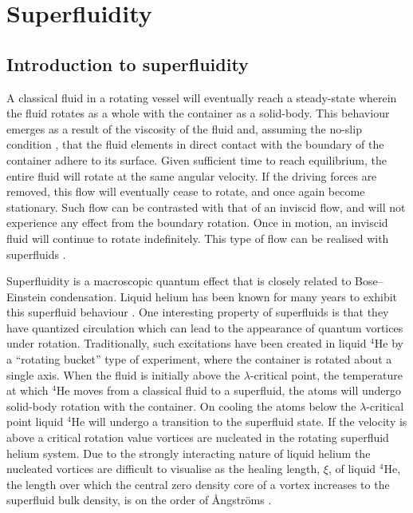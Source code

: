 \section{Superfluidity}\label{sec:superfluid}
\subsection{Introduction to superfluidity}
A classical fluid in a rotating vessel will eventually reach a steady-state wherein the fluid rotates as a whole with the container as a solid-body. This behaviour emerges as a result of the viscosity of the fluid and, assuming the no-slip condition \cite{FL:Day_2010}, that the fluid elements in direct contact with the boundary of the container adhere to its surface. Given sufficient time to reach equilibrium, the entire fluid will rotate at the same angular velocity. If the driving forces are removed, this flow will eventually cease to rotate, and once again become stationary. Such flow can be contrasted with that of an inviscid flow, and will not experience any effect from the boundary rotation. Once in motion, an inviscid fluid will continue to rotate indefinitely. This type of flow can be realised with superfluids \cite{BK:Prandtl_2010}.

Superfluidity is a macroscopic quantum effect that is closely related to Bose--Einstein condensation. Liquid helium has been known for many years to exhibit this superfluid behaviour \cite{BEC:Penrose_pr_1956}. One interesting property of superfluids is that they have quantized circulation which can lead to the appearance of quantum vortices under rotation. Traditionally, such excitations have been created in liquid $^4$He by a ``rotating bucket'' type of experiment, where the container is rotated about a single axis. When the fluid is initially above the $\lambda$-critical point, the temperature at which $^4$He moves from a classical fluid to a superfluid, the atoms will undergo solid-body rotation with the container. On cooling the atoms below the $\lambda$-critical point liquid $^4$He will undergo a transition to the superfluid state. If the velocity is above a critical rotation value vortices are nucleated in the rotating superfluid helium system. Due to the strongly interacting nature of liquid helium the nucleated vortices are difficult to visualise as the healing length, $\xi$, of liquid $^4$He, the length over which the central zero density core of a vortex increases to the superfluid bulk density, is on the order of {\r{A}}ngstr{\"o}ms \cite{BEC:Srinivasen_pramana_2006}.

